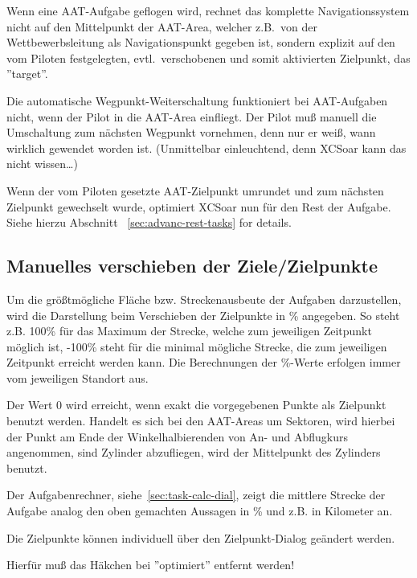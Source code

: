 Wenn eine AAT-Aufgabe geflogen wird, rechnet das komplette Navigationssystem nicht auf den Mittelpunkt der AAT-Area, welcher z.B.\ von der Wettbewerbsleitung als Navigationspunkt gegeben ist, sondern explizit auf den vom Piloten festgelegten, evtl.\ verschobenen und  somit aktivierten Zielpunkt, das ''target''.

Die automatische Wegpunkt-Weiterschaltung  funktioniert bei AAT-Aufgaben nicht, wenn der Pilot in die AAT-Area einfliegt. Der Pilot muß manuell  die Umschaltung zum nächsten Wegpunkt vornehmen, denn nur er weiß, wann wirklich gewendet worden ist. (Unmittelbar einleuchtend, denn \textsf{XCSoar} kann das nicht wissen\dots)

Wenn der vom Piloten gesetzte AAT-Zielpunkt umrundet und zum nächsten Zielpunkt gewechselt wurde, optimiert \textsf{XCSoar} nun für den Rest der Aufgabe. Siehe hierzu Abschnitt ~\ref{sec:advanc-rest-tasks} for details.

\subsection*{Manuelles verschieben der Ziele/Zielpunkte}

Um die größtmögliche Fläche bzw. Streckenausbeute der Aufgaben darzustellen, wird die Darstellung beim Verschieben der Zielpunkte  in \% angegeben.  So steht z.B. 100\% für das Maximum der Strecke, welche zum jeweiligen Zeitpunkt möglich ist, -100\% steht für die minimal mögliche Strecke, die zum jeweiligen Zeitpunkt erreicht werden kann. Die Berechnungen der \%-Werte erfolgen immer vom jeweiligen Standort aus.

Der Wert 0 wird erreicht, wenn exakt die vorgegebenen Punkte als Zielpunkt benutzt werden.  Handelt es sich bei den AAT-Areas um Sektoren, wird hierbei der Punkt am Ende der Winkelhalbierenden von An- und Abflugkurs  angenommen, sind Zylinder abzufliegen, wird der Mittelpunkt des Zylinders benutzt.

Der Aufgabenrechner, siehe~\ref{sec:task-calc-dial}, zeigt die mittlere Strecke der Aufgabe analog den oben gemachten Aussagen in \% und z.B. in Kilometer an.

Die Zielpunkte können individuell über den Zielpunkt-Dialog geändert werden. 
 
 
 Hierfür muß das Häkchen bei ''optimiert'' entfernt werden! \achtung



